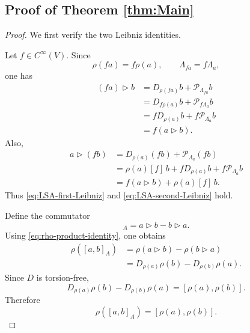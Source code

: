 \documentclass[12pt,reqno]{amsart}
\theoremstyle{definition}
\theoremstyle{remark}
\begin{document}
\subsection{Proof of Theorem \ref{thm:Main}}
\begin{proof}
We first verify the two Leibniz identities.

Let \(f\in C^\infty(V)\). Since
\[
\rho(fa)=f\rho(a),
\qquad
\Lambda_{fa}=f\Lambda_a,
\]
one has
\[
\begin{aligned}
(fa)\triangleright b
&=
D_{\rho(fa)}b+\mathcal P_{\Lambda_{fa}}b
\\
&=
D_{f\rho(a)}b+\mathcal P_{f\Lambda_a}b
\\
&=
fD_{\rho(a)}b+f\mathcal P_{\Lambda_a}b
\\
&=
f(a\triangleright b).
\end{aligned}
\]
Also,
\[
\begin{aligned}
a\triangleright(fb)
&=
D_{\rho(a)}(fb)+\mathcal P_{\Lambda_a}(fb)
\\
&=
\rho(a)[f]\,b
+
fD_{\rho(a)}b
+
f\mathcal P_{\Lambda_a}b
\\
&=
f(a\triangleright b)+\rho(a)[f]\,b.
\end{aligned}
\]
Thus \eqref{eq:LSA-first-Leibniz} and
\eqref{eq:LSA-second-Leibniz} hold.

Define the commutator
\begin{equation}
[a,b]_A
=
a\triangleright b-b\triangleright a.
\label{eq:subadjacent-bracket}
\end{equation}
Using \eqref{eq:rho-product-identity}, one obtains
\[
\begin{aligned}
\rho([a,b]_A)
&=
\rho(a\triangleright b)
-
\rho(b\triangleright a)
\\
&=
D_{\rho(a)}\rho(b)
-
D_{\rho(b)}\rho(a).
\end{aligned}
\]
Since \(D\) is torsion-free,
\[
D_{\rho(a)}\rho(b)
-
D_{\rho(b)}\rho(a)
=
[\rho(a),\rho(b)].
\]
Therefore
\begin{equation}
\rho([a,b]_A)
=
[\rho(a),\rho(b)].
\label{eq:anchor-bracket-compatibility}
\end{equation}


\end{proof}
\end{document}
